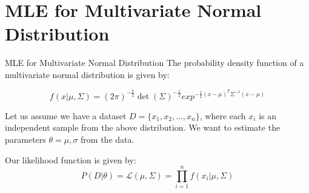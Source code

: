 \documentclass[handout]{beamer}
\begin{document}
\section{MLE for Multivariate Normal Distribution}
\begin{frame}{MLE for Multivariate Normal Distribution}
The probability density function of a multivariate normal distribution is given by:

\begin{equation}
f(x|\mu, \Sigma) = (2\pi)^{-\frac{k}{2}}\det(\Sigma)^{-\frac{1}{2}}exp^{-\frac{1}{2}(x-\mu)^{T}\Sigma^{-1}(x-\mu)}
\end{equation}
\end{frame}
\begin{frame}
Let us assume we have a dataset $D = \{x_1, x_2, \ldots, x_n\}$, where each $x_i$ is an independent sample from the above distribution.
We want to estimate the parameters $\theta = {\mu, \sigma}$ from the data.

Our likelihood function is given by:
\begin{equation}
P(D|\theta) = \mathcal{L}(\mu, \Sigma) = \prod_{i=1}^n f(x_i|\mu, \Sigma)
\end{equation}

\end{frame}
\end{document}
